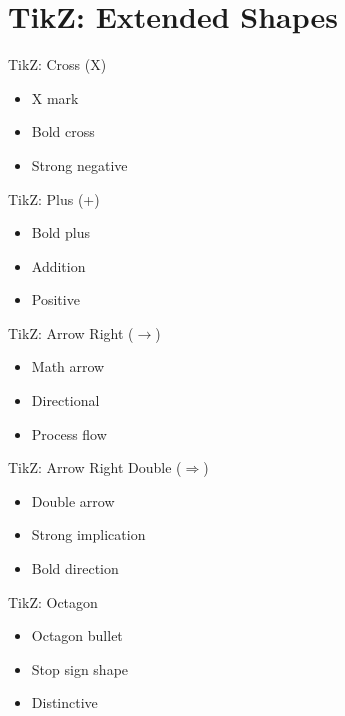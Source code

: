 \documentclass[12pt]{beamer}
\begin{document}
\section{TikZ: Extended Shapes}

\begin{frame}{TikZ: Cross (X)}
\begin{itemize}
  \item X mark
  \item Bold cross
  \item Strong negative
\end{itemize}
\end{frame}

\begin{frame}{TikZ: Plus (+)}
\begin{itemize}
  \item Bold plus
  \item Addition
  \item Positive
\end{itemize}
\end{frame}

\begin{frame}{TikZ: Arrow Right ($\rightarrow$)}
\begin{itemize}
  \item Math arrow
  \item Directional
  \item Process flow
\end{itemize}
\end{frame}

\begin{frame}{TikZ: Arrow Right Double ($\Rightarrow$)}
\begin{itemize}
  \item Double arrow
  \item Strong implication
  \item Bold direction
\end{itemize}
\end{frame}

\begin{frame}{TikZ: Octagon}
\begin{itemize}
  \item Octagon bullet
  \item Stop sign shape
  \item Distinctive
\end{itemize}
\end{frame}
\end{document}
